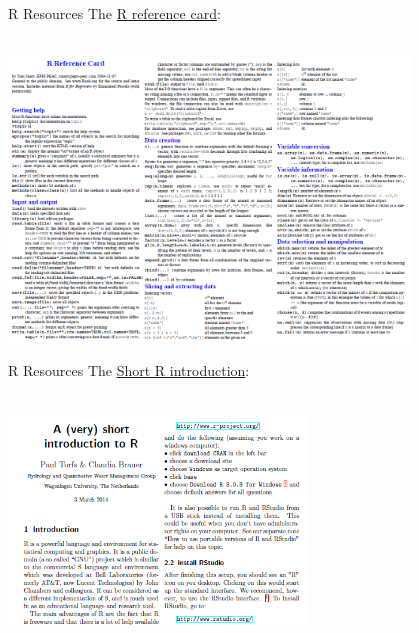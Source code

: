 \documentclass[xcolor=svgnames]{beamer}\usepackage[]{graphicx}\usepackage[]{color}
\begin{document}
\begin{frame}{R Resources}
The \href{http://cran.r-project.org/doc/contrib/Short-refcard.pdf}{R reference card}:\\~\\
\centerline{\includegraphics[width = 0.8\textwidth]{r_ref_card.png}}
\end{frame}

\begin{frame}[t]{R Resources}
The \href{http://cran.r-project.org/doc/contrib/Torfs+Brauer-Short-R-Intro.pdf}{Short R introduction}:\\~\\
\vfill
\centerline{\includegraphics[width = 0.6\textwidth]{r_tutorial.png}}
\vfill
\end{frame}
\end{document}
